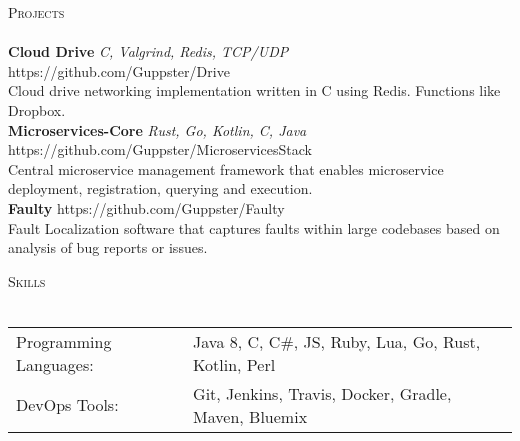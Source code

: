 \documentclass[a4paper]{article}
\newcommand{\lineunder} {
    \vspace*{-8pt} \\
    \hspace*{-18pt} \hrulefill \\
}
\newcommand{\header} [1] {
    {\hspace*{-18pt}\vspace*{6pt} \textsc{#1}}
    \vspace*{-6pt} \lineunder
}
\begin{document}
\newpage

\header{Projects}	
{\textbf{Cloud Drive} \sl C, Valgrind, Redis, TCP/UDP} \hfill https://github.com/Guppster/Drive\\	
\vspace*{1mm}	
Cloud drive networking implementation written in C using Redis. Functions like Dropbox.\\	
\vspace*{2mm}	
{\textbf{Microservices-Core} \sl Rust, Go, Kotlin, C, Java} \hfill https://github.com/Guppster/MicroservicesStack\\	
\vspace*{1mm}	
Central microservice management framework that enables microservice deployment, registration, querying and execution.\\	
\vspace*{2mm}	
{\textbf{Faulty} \sl } \hfill https://github.com/Guppster/Faulty\\	
\vspace*{1mm}	
Fault Localization software that captures faults within large codebases based on analysis of bug reports or issues.\\	
\vspace*{2mm}	

\header{Skills}
\begin{tabular}{ l l }
	Programming Languages: & Java 8, C, C\#, JS, Ruby, Lua, Go, Rust, Kotlin, Perl \\
	DevOps Tools:          & Git, Jenkins, Travis, Docker, Gradle, Maven, Bluemix \\
\end{tabular}
\end{document}
